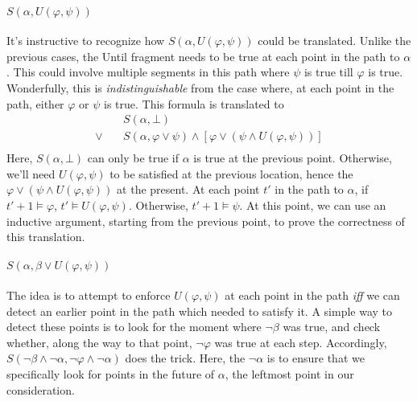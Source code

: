 \documentclass[a4paper,UKenglish,cleveref, autoref, thm-restate]{lipics-v2021}
\begin{document}
\paragraph*{$S(\alpha, U(\varphi, \psi))$}
It's instructive to recognize how $S(\alpha, U(\varphi, \psi))$ could be translated. Unlike the previous cases, the Until fragment needs to be true at each point in the path to $\alpha$. This could involve multiple segments in this path where $\psi$ is true till $\varphi$ is true. Wonderfully, this is \textit{indistinguishable} from the case where, at each point in the path, either $\varphi$ or $\psi$ is true. This formula is translated to %
\begin{equation*}
    \begin{aligned}
        &S(\alpha, \bot) \\
        \lor \quad &S(\alpha, \varphi \lor \psi) \land \left[ \varphi \lor \left(\psi \land U\left(\varphi, \psi \right) \right) \right] \\
    \end{aligned}
\end{equation*}
Here, $S(\alpha, \bot)$ can only be true if $\alpha$ is true at the previous point. Otherwise, we'll need $U(\varphi, \psi)$ to be satisfied at the previous location, hence the $\varphi \lor (\psi \land U(\varphi, \psi))$ at the present. At each point $t'$ in the path to $\alpha$, if $t' + 1 \vDash \varphi$, $t' \vDash U(\varphi, \psi)$. Otherwise, $t' + 1 \vDash \psi$. At this point, we can use an inductive argument, starting from the previous point, to prove the correctness of this translation.

\paragraph*{$S(\alpha, \beta \lor U(\varphi, \psi))$}


The idea is to attempt to enforce $U(\varphi, \psi)$ at each point in the path \textit{iff} we can detect an earlier point in the path which needed to satisfy it. A simple way to detect these points is to look for the moment where $\lnot \beta$ was true, and check whether, along the way to that point, $\lnot \varphi$ was true at each step. Accordingly, $S(\lnot \beta \land \lnot \alpha, \lnot \varphi \land \lnot \alpha)$ does the trick. Here, the $\lnot \alpha$ is to ensure that we specifically look for points in the future of $\alpha$, the leftmost point in our consideration.
\end{document}

